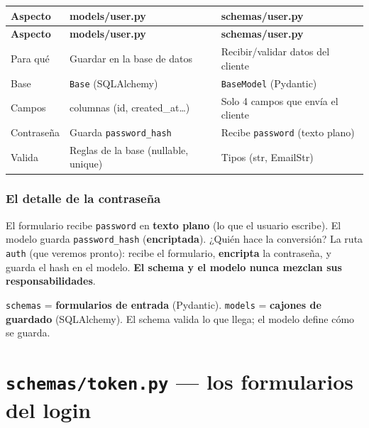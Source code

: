 \documentclass[11pt,a4paper]{article}
\begin{document}
\begin{center}
{\small
\setlength{\tabcolsep}{4pt}
\begin{longtable}{@{}>{\raggedright\arraybackslash}p{4.2cm}>{\raggedright\arraybackslash}p{5.2cm}>{\raggedright\arraybackslash}p{5.5cm}@{}}
\toprule
\textbf{Aspecto} & \textbf{models/user.py} & \textbf{schemas/user.py} \\
\midrule
\endfirsthead
\toprule
\textbf{Aspecto} & \textbf{models/user.py} & \textbf{schemas/user.py} \\
\midrule
\endhead
Para qué & Guardar en la base de datos & Recibir/validar datos del cliente \\
Base & \texttt{Base} (SQLAlchemy) & \texttt{BaseModel} (Pydantic) \\
Campos & 10 columnas (id, created\_at\ldots) & Solo 4 campos que envía el cliente \\
Contraseña & Guarda \texttt{password\_hash} & Recibe \texttt{password} (texto plano) \\
Valida & Reglas de la base (nullable, unique) & Tipos (str, EmailStr) \\
\bottomrule
\end{longtable}
}
\end{center}

\subsubsection{El detalle de la contraseña}

El formulario recibe \texttt{password} en \textbf{texto plano} (lo que el usuario escribe).
El modelo guarda \texttt{password\_hash} (\textbf{encriptada}). ¿Quién hace la conversión?
La ruta \texttt{auth} (que veremos pronto): recibe el formulario, \textbf{encripta} la
contraseña, y guarda el hash en el modelo. \textbf{El schema y el modelo nunca mezclan sus responsabilidades}.

\begin{recuadro}
\texttt{schemas} = \textbf{formularios de entrada} (Pydantic). \texttt{models} = \textbf{cajones
de guardado} (SQLAlchemy). El schema valida lo que llega; el modelo define cómo se guarda.
\end{recuadro}

\section{\texttt{schemas/token.py} --- los formularios del login}
\end{document}
